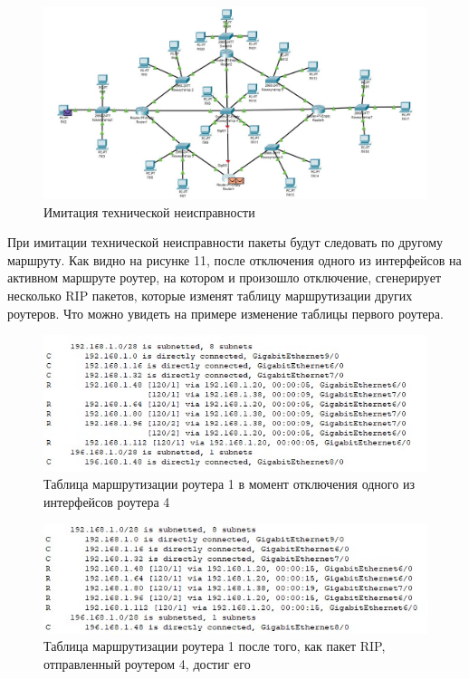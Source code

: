 \documentclass[bachelor, och, labwork]{shiza}
\begin{document}
\begin{enumerate}
    \begin{figure}[H]
        \centering      %
        \includegraphics[width=1.\textwidth]{11}
        \caption{Имитация технической неисправности}
        \label{fig:image1}
    \end{figure}

    При имитации технической неисправности пакеты будут следовать по другому маршруту. Как видно на рисунке 11, после отключения одного из 
    интерфейсов на активном маршруте роутер, на котором и произошло отключение, сгенерирует несколько RIP пакетов, которые изменят 
    таблицу маршрутизации других роутеров. Что можно увидеть на примере изменение таблицы первого роутера.

    \begin{figure}[H]
        \centering      %
        \includegraphics[width=1.\textwidth]{12}
        \caption{Таблица маршрутизации роутера 1 в момент отключения одного из интерфейсов роутера 4}
        \label{fig:image1}
    \end{figure}

    \begin{figure}[H]
        \centering      %
        \includegraphics[width=1.\textwidth]{13}
        \caption{Таблица маршрутизации роутера 1 после того, как пакет RIP, отправленный роутером 4, достиг его}
        \label{fig:image1}
    \end{figure}


\end{enumerate}
\end{document}
